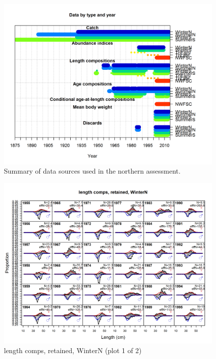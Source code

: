 \documentclass[12pt,]{article}
\begin{document}
\begin{figure}[htbp]
\centering
\includegraphics{r4ss/plots_mod1/data_plot.png}
\caption{Summary of data sources used in the northern assessment.
\label{fig:data_plot}}
\end{figure}

\FloatBarrier

\FloatBarrier

\FloatBarrier

\FloatBarrier

\FloatBarrier

\FloatBarrier

\begin{figure}[htbp]
\centering
\includegraphics{./r4ss/plots_mod1/comp_lenfit_flt1mkt2_page1.png}
\caption{length comps, retained, WinterN (plot 1 of 2)
\label{fig:mod1_1_comp_lenfit_flt1mkt2_page1}}
\end{figure}
\end{document}
